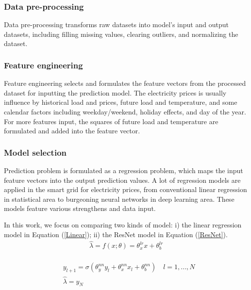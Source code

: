 \documentclass[journal]{IEEEtran}
\begin{document}
\subsubsection{Data pre-processing}
Data pre-processing transforms raw datasets into model's input and output datasets, including filling missing values,  clearing outliers, and normalizing the dataset. 

\subsubsection{Feature engineering}
Feature engineering selects and formulates the feature vectors from the processed dataset for inputting the prediction model. The electricity prices is usually influence by historical load and prices, future load and temperature, and some calendar factors including weekday/weekend, holiday effects, and day of the year. For more features input, the squares of future load and temperature are formulated and added into the feature vector.

\subsubsection{Model selection}
Prediction problem is formulated as a regression problem, which maps the input feature vectors into the output prediction values. A lot of regression models are applied in the smart grid for electricity prices, from conventional linear regression in statistical area to burgeoning neural networks in deep learning area. These models feature various strengthens and data input. 

In this work, we focus on comparing two kinds of model: i) the linear regression model in Equation (\ref{Linear}); ii) the ResNet model in Equation (\ref{ResNet}). 
\begin{equation}
  \label{Linear}
  \begin{aligned}
    \hat{\lambda} = f(x; \theta) = \theta_x^{lr} x + \theta_b^{lr} \\ 
  \end{aligned}
\end{equation}

\begin{equation}
  \label{ResNet}
  \begin{aligned}
    & y_{l+1} = \sigma (\theta_y^{nn} y_l + \theta_x^{nn} x_l + \theta_b^{nn}) \quad l = 1, ..., N \\
    & \hat{\lambda} = y_{N} \\
  \end{aligned}
\end{equation}
\end{document}
